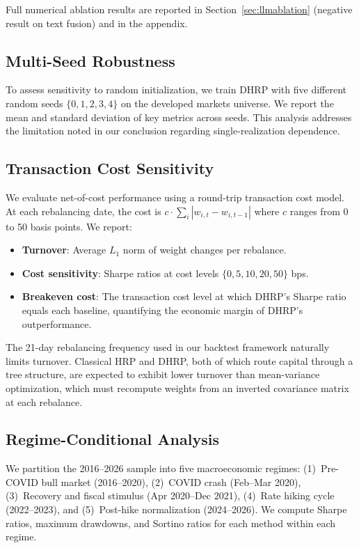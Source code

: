 \documentclass{article}
\begin{document}
Full numerical ablation results are reported in Section~\ref{sec:llmablation} (negative result on text fusion) and in the appendix.

\subsection{Multi-Seed Robustness}

To assess sensitivity to random initialization, we train DHRP with five different random seeds $\{0, 1, 2, 3, 4\}$ on the developed markets universe. We report the mean and standard deviation of key metrics across seeds. This analysis addresses the limitation noted in our conclusion regarding single-realization dependence.

\subsection{Transaction Cost Sensitivity}

We evaluate net-of-cost performance using a round-trip transaction cost model. At each rebalancing date, the cost is $c \cdot \sum_i |w_{i,t} - w_{i,t-1}|$ where $c$ ranges from 0 to 50 basis points. We report:
\begin{itemize}
\item \textbf{Turnover}: Average $L_1$ norm of weight changes per rebalance.
\item \textbf{Cost sensitivity}: Sharpe ratios at cost levels $\{0, 5, 10, 20, 50\}$ bps.
\item \textbf{Breakeven cost}: The transaction cost level at which DHRP's Sharpe ratio equals each baseline, quantifying the economic margin of DHRP's outperformance.
\end{itemize}

The 21-day rebalancing frequency used in our backtest framework naturally limits turnover. Classical HRP and DHRP, both of which route capital through a tree structure, are expected to exhibit lower turnover than mean-variance optimization, which must recompute weights from an inverted covariance matrix at each rebalance.

\subsection{Regime-Conditional Analysis}

We partition the 2016--2026 sample into five macroeconomic regimes: (1)~Pre-COVID bull market (2016--2020), (2)~COVID crash (Feb--Mar 2020), (3)~Recovery and fiscal stimulus (Apr 2020--Dec 2021), (4)~Rate hiking cycle (2022--2023), and (5)~Post-hike normalization (2024--2026). We compute Sharpe ratios, maximum drawdowns, and Sortino ratios for each method within each regime.
\end{document}
